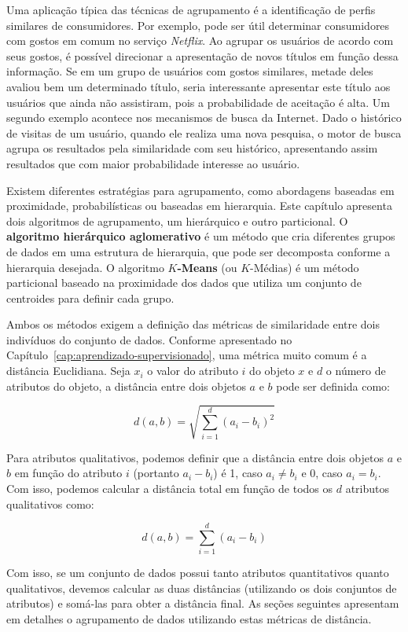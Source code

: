 Uma aplicação típica das técnicas de agrupamento é a identificação de perfis similares de consumidores. Por exemplo, pode ser útil determinar consumidores com gostos em comum no serviço \textit{Netflix}. Ao agrupar os usuários de acordo com seus gostos, é possível direcionar a apresentação de novos títulos em função dessa informação. Se em um grupo de usuários com gostos similares, metade deles avaliou bem um determinado título, seria interessante apresentar este título aos usuários que ainda não assistiram, pois a probabilidade de aceitação é alta. Um segundo exemplo acontece nos mecanismos de busca da Internet. Dado o histórico de visitas de um usuário, quando ele realiza uma nova pesquisa, o motor de busca agrupa os resultados pela similaridade com seu histórico, apresentando assim resultados que com maior probabilidade interesse ao usuário.

Existem diferentes estratégias para agrupamento, como abordagens baseadas em proximidade, probabilísticas ou baseadas em hierarquia. Este capítulo apresenta dois algoritmos de agrupamento, um hierárquico e outro particional. O \textbf{algoritmo hierárquico aglomerativo} é um método que cria diferentes grupos de dados em uma estrutura de hierarquia, que pode ser decomposta conforme a hierarquia desejada. O algoritmo \textbf{$K$-Means} (ou $K$-Médias) é um método particional baseado na proximidade dos dados que utiliza um conjunto de centroides para definir cada grupo.

Ambos os métodos exigem a definição das métricas de similaridade entre dois indivíduos do conjunto de dados. Conforme apresentado no Capítulo~\ref{cap:aprendizado-supervisionado}, uma métrica muito comum é a distância Euclidiana. Seja $x_i$ o valor do atributo $i$ do objeto $x$ e $d$ o número de atributos do objeto, a distância entre dois objetos $a$ e $b$ pode ser definida como:

$$
d(a, b) = \sqrt{\sum_{i=1}^{d} (a_i - b_i)^2}
$$

Para atributos qualitativos, podemos definir que a distância entre dois objetos $a$ e $b$ em função do atributo $i$ (portanto $a_i - b_i$) é 1, caso $a_i \neq b_i$ e 0, caso $a_i = b_i$. Com isso, podemos calcular a distância total em função de todos os $d$ atributos qualitativos como:

$$
d(a, b) = \sum_{i=1}^{d} (a_i - b_i)
$$

Com isso, se um conjunto de dados possui tanto atributos quantitativos quanto qualitativos, devemos calcular as duas distâncias (utilizando os dois conjuntos de atributos) e somá-las para obter a distância final. As seções seguintes apresentam em detalhes o agrupamento de dados utilizando estas métricas de distância.


